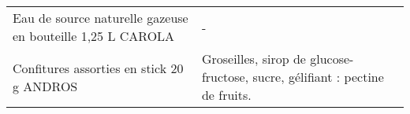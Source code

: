 \begin{longtable}{p{5cm}p{10cm}}
                                               Eau de source naturelle gazeuse en bouteille 1,25 L CAROLA &                                                                                                                                                                                                                                                                                                                                                                                                                                                                                                                                                                                                                                                                                                                                                                                                                                                                                                                                                                                                                                        - \\
                                                                Confitures assorties en stick 20 g ANDROS &                                                                                                                                                                                                                                                                                                                                                                                                                                                                                                                                                                                                                                                                                                                                                                                                                                                                                                                                                             Groseilles, sirop de glucose-fructose, sucre, gélifiant : pectine de fruits. \\

\end{longtable}
